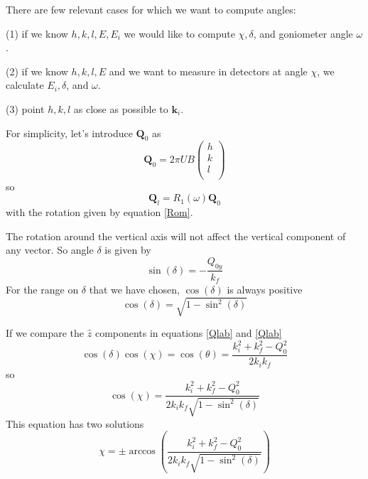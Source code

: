 \documentclass[prb]{revtex4}%
\begin{document}
There are few relevant cases for which we want to compute angles:

(1) if we know $h, k, l, E, E_i$ we would like to compute $\chi, \delta$, and goniometer angle $\omega$.

(2) if we know $h, k, l, E$ and we want to measure in detectors at angle $\chi$, we calculate $E_i, \delta$, and $\omega$.

(3) point $h, k, l$ as close as possible to $\textbf{k}_i$.

For simplicity, let's introduce $\textbf{Q}_0$ as
\begin{equation}
    \textbf{Q}_0 = 2 \pi U B \left(
                               \begin{array}{c}
                                 h \\
                                 k \\
                                 l \\
                               \end{array}
                             \right)
\end{equation}
so
\begin{equation}
    \textbf{Q}_l = R_1(\omega) \textbf{Q}_0
\end{equation}
with the rotation given by equation \ref{Rom}.

The rotation around the vertical axis will not affect the vertical component of any vector. So angle $\delta$ is given by
\begin{equation}\label{sindelta}
    \sin(\delta) = -\frac{Q_{0y}}{k_f}
\end{equation}
For the range on $\delta$ that we have chosen, $\cos(\delta)$ is always positive
\begin{equation}
    \cos(\delta) = \sqrt{1-\sin^2(\delta)}
\end{equation}

If we compare the $\widehat{z}$ components in equations \ref{Qlab} and \ref{Qlab}
\begin{equation}
    \cos(\delta) \cos(\chi) = \cos(\theta) = \frac{k_i^2 + k_f^2 -Q_0^2}{2 k_i k_f}
\end{equation}
so
\begin{equation}\label{coschi}
    \cos(\chi) = \frac{k_i^2 + k_f^2 -Q_0^2}{2 k_i k_f\sqrt{1-\sin^2(\delta)}}
\end{equation}
This equation has two solutions
\begin{equation}
    \chi = \pm \arccos\left(\frac{k_i^2 + k_f^2 -Q_0^2}{2 k_i k_f\sqrt{1-\sin^2(\delta)}}\right)
\end{equation}
\end{document}

